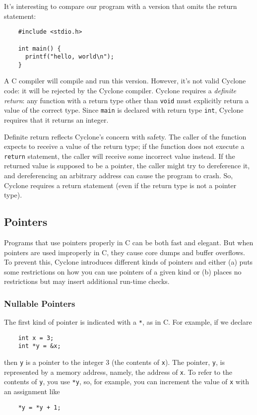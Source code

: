 It's interesting to compare our program with a version that omits the
return statement:
\begin{verbatim}
    #include <stdio.h>

    int main() {
      printf("hello, world\n");
    }
\end{verbatim}

A C compiler will compile and run this version.  However, it's not
valid Cyclone code: it will be rejected by the Cyclone compiler.
Cyclone requires a \emph{definite return}: any function with a return
type other than \texttt{void} must explicitly return a value of the
correct type.  Since \texttt{main} is declared with return type
\texttt{int}, Cyclone requires that it returns an integer.

Definite return reflects Cyclone's concern with safety.  The caller of
the function expects to receive a value of the return type; if the
function does not execute a \texttt{return} statement, the caller will
receive some incorrect value instead.  If the returned value is supposed
to be a pointer, the caller might try to dereference it, and
dereferencing an arbitrary address can cause the program to crash.  So,
Cyclone requires a return statement (even if the return type is not a
pointer type).

\subsection{Pointers}

Programs that use pointers properly in C can be both fast and elegant.
But when pointers are used improperly in C, they cause core dumps and
buffer overflows.  To prevent this, Cyclone introduces different kinds
of pointers and either (a) puts some restrictions on how you can use pointers
of a given kind or (b) places no restrictions but may insert additional
run-time checks.  

\subsubsection*{Nullable Pointers}

The first kind of pointer is indicated with a \texttt{*}, as in C\@.  For
example, if we declare
\begin{verbatim}
    int x = 3;
    int *y = &x;
\end{verbatim}
then \texttt{y} is a pointer to the integer 3 (the contents of
\texttt{x}).  The pointer, \texttt{y}, is represented by a memory
address, namely, the address of \texttt{x}.  To refer to the contents
of \texttt{y}, you use \texttt{*y}, so, for example, you can increment
the value of \texttt{x} with an assignment like
\begin{verbatim}
    *y = *y + 1;
\end{verbatim}

